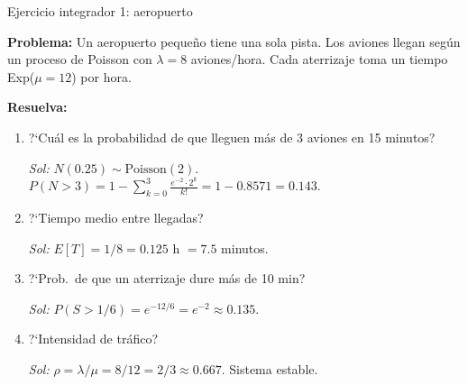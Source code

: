 \documentclass[aspectratio=1610, 9pt]{beamer}
\begin{document}
\begin{frame}{Ejercicio integrador 1: aeropuerto}

\textbf{Problema:} Un aeropuerto peque\~{n}o tiene una sola pista. Los aviones llegan seg\'{u}n un proceso de Poisson con $\lambda = 8$ aviones/hora. Cada aterrizaje toma un tiempo Exp($\mu = 12$) por hora.

\vspace{0.3cm}
\textbf{Resuelva:}
\begin{enumerate}
    \item ?`Cu\'{a}l es la probabilidad de que lleguen m\'{a}s de 3 aviones en 15 minutos?

    \textit{Sol:} $N(0.25) \sim \text{Poisson}(2)$. $P(N>3) = 1 - \sum_{k=0}^{3} \frac{e^{-2}\cdot 2^k}{k!} = 1 - 0.8571 = 0.143$.

    \vspace{0.15cm}
    \item ?`Tiempo medio entre llegadas?

    \textit{Sol:} $E[T] = 1/8 = 0.125$ h $= 7.5$ minutos.

    \vspace{0.15cm}
    \item ?`Prob.\ de que un aterrizaje dure m\'{a}s de 10 min?

    \textit{Sol:} $P(S > 1/6) = e^{-12/6} = e^{-2} \approx 0.135$.

    \vspace{0.15cm}
    \item ?`Intensidad de tr\'{a}fico?

    \textit{Sol:} $\rho = \lambda/\mu = 8/12 = 2/3 \approx 0.667$. Sistema estable.
\end{enumerate}
\end{frame}
\end{document}
